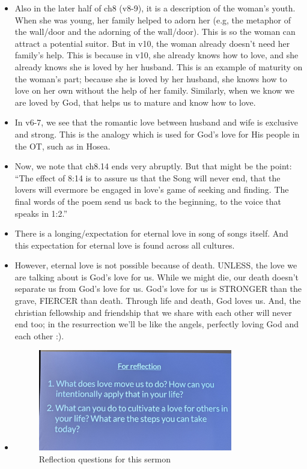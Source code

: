 \begin{itemize}
  \item{Also in the later half of ch8 (v8-9), it is a description of the woman’s youth. When she was young, her family helped to adorn her (e.g, the metaphor of the wall/door and the adorning of the wall/door).  This is so the woman can attract a potential suitor. But in v10, the woman already doesn’t need her family’s help. This is because in v10, she already knows how to love, and she already knows she is loved by her husband. This is an example of maturity on the woman’s part; because she is loved by her husband, she knows how to love on her own without the help of her family. Similarly, when we know we are loved by God, that helps us to mature and know how to love. }
  \item{In v6-7, we see that the romantic love between husband and wife is exclusive and strong. This is the analogy which is used for God’s love for His people in the OT, such as in Hosea. }
  \item{Now, we note that ch8.14 ends very abruptly. But that might be the point: ``The effect of 8:14 is to assure us that the Song will never end, that the lovers will evermore be engaged in love's game of seeking and finding. The final words of the poem send us back to the beginning, to the voice that speaks in 1:2.''}
  \item{There is a longing/expectation for eternal love in song of songs itself. And this expectation for eternal love is found across all cultures.}
  \item{However, eternal love is not possible because of death. UNLESS, the love we are talking about is God’s love for us. While we might die, our death doesn’t separate us from God’s love for us. God’s love for us is STRONGER than the grave, FIERCER than death. Through life and death, God loves us. And, the christian fellowship and friendship that we share with each other will never end too; in the resurrection we’ll be like the angels, perfectly loving God and each other :).}
  \item{\begin{figure}[H]
    \centering
    \includegraphics[width=0.8\textwidth, trim={0cm 0cm 0cm 0cm},clip]{Figures/septemberSermon4Reflections.jpg}
    \caption[]{Reflection questions for this sermon}
  \end{figure}}
\end{itemize}